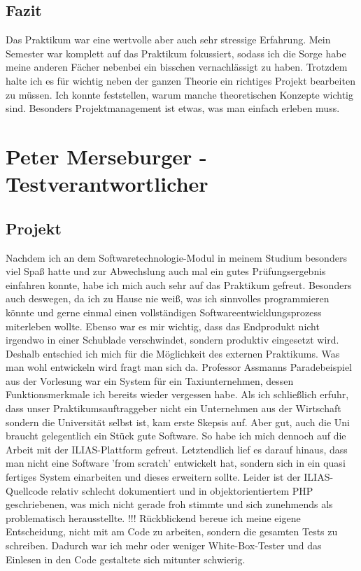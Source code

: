 \documentclass[a4paper]{scrreprt}
\begin{document}
\section{Fazit}

Das Praktikum war eine wertvolle aber auch sehr stressige Erfahrung. Mein Semester war komplett auf das Praktikum fokussiert, sodass ich die Sorge habe meine anderen Fächer nebenbei ein bisschen vernachlässigt zu haben. Trotzdem halte ich es für wichtig neben der ganzen Theorie ein richtiges Projekt bearbeiten zu müssen. Ich konnte feststellen, warum manche theoretischen Konzepte wichtig sind. Besonders Projektmanagement ist etwas, was man einfach erleben muss.

\chapter{Peter Merseburger - Testverantwortlicher}

\section{Projekt}
Nachdem ich an dem Softwaretechnologie-Modul in meinem Studium besonders viel Spaß hatte und zur Abwechslung auch mal ein gutes Prüfungsergebnis einfahren konnte, habe ich mich auch sehr auf das Praktikum gefreut. Besonders auch deswegen, da ich zu Hause nie weiß, was ich sinnvolles programmieren könnte und gerne einmal einen vollständigen Softwareentwicklungsprozess miterleben wollte. Ebenso war es mir wichtig, dass das Endprodukt nicht irgendwo in einer Schublade verschwindet, sondern produktiv eingesetzt wird. Deshalb entschied ich mich für die Möglichkeit des externen Praktikums.
Was man wohl entwickeln wird fragt man sich da. Professor Assmanns Paradebeispiel aus der Vorlesung war ein System für ein Taxiunternehmen, dessen Funktionsmerkmale ich bereits wieder vergessen habe. Als ich schließlich erfuhr, dass unser Praktikumsauftraggeber nicht ein Unternehmen aus der Wirtschaft sondern die Universität selbst ist, kam erste Skepsis auf. Aber gut, auch die Uni braucht gelegentlich ein Stück gute Software. So habe ich mich dennoch auf die Arbeit mit der ILIAS-Plattform gefreut. Letztendlich lief es darauf hinaus, dass man nicht eine Software 'from scratch' entwickelt hat, sondern sich in ein quasi fertiges System einarbeiten und dieses erweitern sollte. Leider ist der ILIAS-Quellcode relativ schlecht dokumentiert und in objektorientiertem PHP geschriebenen, was mich nicht gerade froh stimmte und sich zunehmends als problematisch herausstellte.
!!!
Rückblickend bereue ich meine eigene Entscheidung, nicht mit am Code zu arbeiten, sondern die gesamten Tests zu schreiben. Dadurch war ich mehr oder weniger White-Box-Tester und das Einlesen in den Code gestaltete sich mitunter schwierig.
\end{document}
